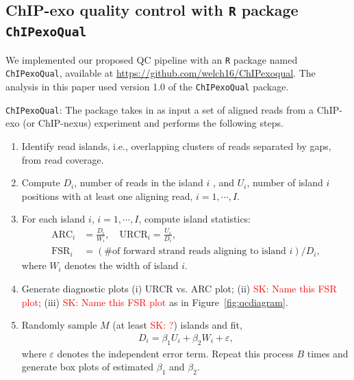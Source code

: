 \documentclass{bmcart}
\newcommand{\pname}[1]{\texttt{ChIPexoQual}}
\newcommand{\SK}[1]{\textcolor{red}{SK: #1}}
\begin{document}




\subsection*{ChIP-exo quality control with \texttt{R} package \texttt{ChIPexoQual}}

We implemented our proposed QC pipeline with an \texttt{R} package named \texttt{ChIPexoQual}, available at 
\url{https://github.com/welch16/ChIPexoqual}. The analysis in this paper used version 1.0 of the \pname{} package.

\begin{framed}
\noindent \texttt{ChIPexoQual}: 
The package takes in as input a set of aligned reads from a
ChIP-exo (or ChIP-nexus) experiment and performs the following steps.


\begin{enumerate}
\item Identify read islands, i.e., overlapping clusters of reads separated by gaps, from  read coverage. 
  
\item Compute $D_i$,  number of reads in the  island $i$ , and $U_i$, number of island $i$ positions with at least one aligning read, $i=1, \cdots, I$.

\item For each island $i$, $i=1, \cdots, I$, compute island statistics:
  \begin{align*}
    \mbox{ARC}_i &= \frac{D_i}{W_i}, \quad \mbox{URCR}_i = \frac{U_i}{D_i},  \\
    \mbox{FSR}_i &= (\text{\# of forward strand reads aligning to island $i$})/D_i, 
  \end{align*}
  where $W_i$ denotes the width of island $i$.
\item Generate diagnostic plots (i) URCR vs. ARC plot; (ii) \SK{Name this FSR plot}; (iii) \SK{Name this FSR plot} as in Figure~\ref{fig:qcdiagram}.
\item Randomly sample $M$ (at least \SK{?}) islands and fit, 
  \begin{align*}
    D_i = \beta_1 U_i + \beta_2 W_i + \varepsilon,
  \end{align*}
  where $\varepsilon$ denotes the independent error term.  Repeat this process $B$ times and generate  box plots of estimated $\beta_1$ and $\beta_2$. 
\end{enumerate}

\end{framed}
\end{document}
